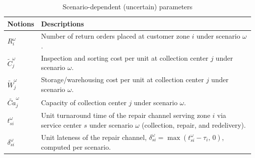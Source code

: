\documentclass[11pt, a4paper]{article}
\begin{document}
\hypertarget{t2b}{}
\begin{table}[!htb]
\footnotesize
\renewcommand{\arraystretch}{1.25}
\caption{Scenario-dependent (uncertain) parameters}
\label{tab:uparam}
\begin{tabular}{p{1.5cm}p{13.5cm}}
\toprule
Notions & Descriptions\\
\midrule
$R_i^{\omega}$ & Number of return orders placed at customer zone $i$ under scenario $\omega$. \\
$\widetilde{C}_j^{\omega}$ & Inspection and sorting cost per unit at collection center $j$ under scenario $\omega$. \\
$\widetilde{W}_j^{\omega}$ & Storage/warehousing cost per unit at collection center $j$ under scenario $\omega$. \\
$\widetilde{Ca}_j^{\omega}$ & Capacity of collection center $j$ under scenario $\omega$. \\
$t_{si}^{\omega}$ & Unit turnaround time of the repair channel serving zone $i$ via service center $s$ under scenario $\omega$ (collection, repair, and redelivery). \\
$\delta_{si}^{\omega}$ & Unit lateness of the repair channel, $\delta_{si}^{\omega}=\max(t_{si}^{\omega}-\tau_i,\,0)$, computed per scenario. \\
\bottomrule
\end{tabular}
\end{table}
\end{document}
